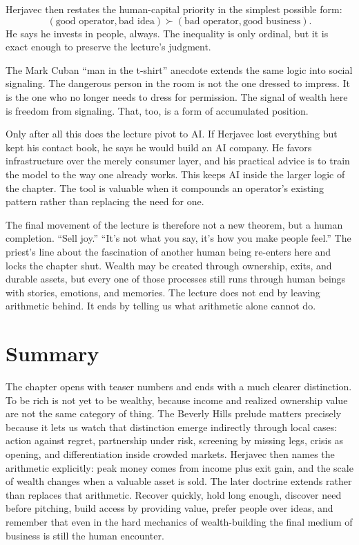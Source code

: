 Herjavec then restates the human-capital priority in the simplest possible form:
\begin{equation}
(\text{good operator},\text{bad idea})
\succ
(\text{bad operator},\text{good business}).
\end{equation}
He says he invests in people, always. The inequality is only ordinal, but it is exact enough to preserve the lecture's judgment.

The Mark Cuban ``man in the t-shirt'' anecdote extends the same logic into social signaling. The dangerous person in the room is not the one dressed to impress. It is the one who no longer needs to dress for permission. The signal of wealth here is freedom from signaling. That, too, is a form of accumulated position.

Only after all this does the lecture pivot to AI. If Herjavec lost everything but kept his contact book, he says he would build an AI company. He favors infrastructure over the merely consumer layer, and his practical advice is to train the model to the way one already works. This keeps AI inside the larger logic of the chapter. The tool is valuable when it compounds an operator's existing pattern rather than replacing the need for one.

The final movement of the lecture is therefore not a new theorem, but a human completion. ``Sell joy.'' ``It's not what you say, it's how you make people feel.'' The priest's line about the fascination of another human being re-enters here and locks the chapter shut. Wealth may be created through ownership, exits, and durable assets, but every one of those processes still runs through human beings with stories, emotions, and memories. The lecture does not end by leaving arithmetic behind. It ends by telling us what arithmetic alone cannot do.

\section{Summary}

The chapter opens with teaser numbers and ends with a much clearer distinction. To be rich is not yet to be wealthy, because income and realized ownership value are not the same category of thing. The Beverly Hills prelude matters precisely because it lets us watch that distinction emerge indirectly through local cases: action against regret, partnership under risk, screening by missing legs, crisis as opening, and differentiation inside crowded markets. Herjavec then names the arithmetic explicitly: peak money comes from income plus exit gain, and the scale of wealth changes when a valuable asset is sold. The later doctrine extends rather than replaces that arithmetic. Recover quickly, hold long enough, discover need before pitching, build access by providing value, prefer people over ideas, and remember that even in the hard mechanics of wealth-building the final medium of business is still the human encounter.